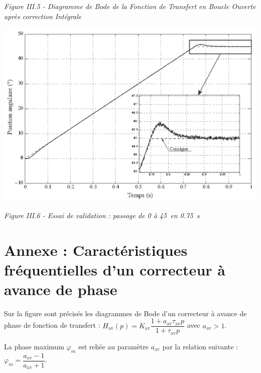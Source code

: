 \documentclass[10pt,fleqn]{article} %
\begin{document}
\begin{multicols}{2}
\begin{minipage}[c]{.48\linewidth}
\begin{center}
\textit{Figure III.5 - Diagramme de Bode de la Fonction de Transfert en Boucle Ouverte après correction Intégrale}
\end{center}
\end{minipage} \hfill
\begin{minipage}[c]{.48\linewidth}
\begin{center}
\includegraphics[width=.95\linewidth]{images/pt_11}

\textit{Figure III.6 - Essai de validation : passage de 0 à 45\degres \, en  \SI{0,75}{s}}
\end{center}
\end{minipage}








\section*{Annexe : Caractéristiques fréquentielles d’un correcteur à avance de phase}
 


\begin{minipage}[c]{.4\linewidth}
Sur la figure sont précisés les diagrammes de Bode d'un correcteur à avance de phase de fonction de transfert :
$H_{\text{av}}(p)=K_{\text{av}}\dfrac{1+a_{\text{av}}\tau_{\text{av}}p}{1+\tau_{\text{av}}p}$ avec $a_{\text{av}}>1$.


La phase maximum $\varphi_m$ est reliée au paramètre $a_{\text{av}}$ par la relation suivante : $\varphi_m=\dfrac{a_{\text{av}}-1}{a_{\text{av}}+1}$.
\end{minipage} \hfill
\begin{minipage}[c]{.58\linewidth}
\begin{center}


\end{center}
\end{minipage}
\end{multicols}
\end{document}
